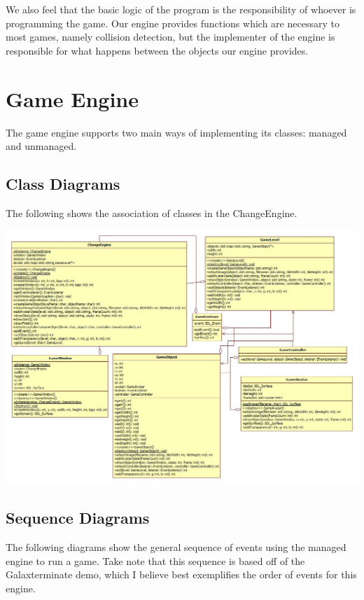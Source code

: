 \documentclass[12pt]{article}
\begin{document}
    We also feel that the basic logic of the program is the responsibility of whoever is programming the game. Our engine provides functions which are necessary to most games, namely collision detection, but the implementer of the engine is responsible for what happens between the objects our engine provides.

  \section{Game Engine}
    The game engine supports two main ways of implementing its classes: managed and unmanaged.

\pagebreak
\subsection{Class Diagrams}
The following shows the association of classes in the ChangeEngine.

\hspace*{-1.3in}
\includegraphics[width=7.5in]{class-diagram.jpg}

\pagebreak

\subsection{Sequence Diagrams}
The following diagrams show the general sequence of events using the managed engine to run a game. Take note that this sequence is based off of the Galaxterminate demo, which I believe best exemplifies the order of events for this engine.
\end{document}
